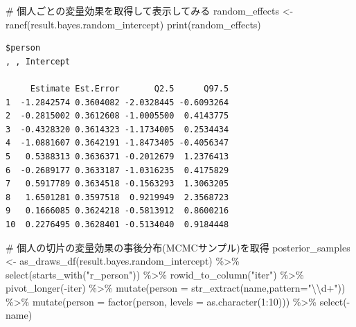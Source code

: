 \documentclass[
  a4paper,
]{ltjsbook}
\newenvironment{Shaded}{\begin{snugshade}}{\end{snugshade}}
\newcommand{\AttributeTok}[1]{\textcolor[rgb]{0.40,0.45,0.13}{#1}}
\newcommand{\CommentTok}[1]{\textcolor[rgb]{0.37,0.37,0.37}{#1}}
\newcommand{\DecValTok}[1]{\textcolor[rgb]{0.68,0.00,0.00}{#1}}
\newcommand{\FunctionTok}[1]{\textcolor[rgb]{0.28,0.35,0.67}{#1}}
\newcommand{\NormalTok}[1]{\textcolor[rgb]{0.00,0.23,0.31}{#1}}
\newcommand{\OtherTok}[1]{\textcolor[rgb]{0.00,0.23,0.31}{#1}}
\newcommand{\SpecialCharTok}[1]{\textcolor[rgb]{0.37,0.37,0.37}{#1}}
\newcommand{\StringTok}[1]{\textcolor[rgb]{0.13,0.47,0.30}{#1}}
\begin{document}
\begin{Shaded}
\begin{Highlighting}[]
\CommentTok{\# 個人ごとの変量効果を取得して表示してみる}
\NormalTok{random\_effects }\OtherTok{\textless{}{-}} \FunctionTok{ranef}\NormalTok{(result.bayes.random\_intercept)}
\FunctionTok{print}\NormalTok{(random\_effects)}
\end{Highlighting}
\end{Shaded}

\begin{verbatim}
$person
, , Intercept

     Estimate Est.Error       Q2.5      Q97.5
1  -1.2842574 0.3604082 -2.0328445 -0.6093264
2  -0.2815002 0.3612608 -1.0005500  0.4143775
3  -0.4328320 0.3614323 -1.1734005  0.2534434
4  -1.0881607 0.3642191 -1.8473405 -0.4056347
5   0.5388313 0.3636371 -0.2012679  1.2376413
6  -0.2689177 0.3633187 -1.0316235  0.4175829
7   0.5917789 0.3634518 -0.1563293  1.3063205
8   1.6501281 0.3597518  0.9219949  2.3568723
9   0.1666085 0.3624218 -0.5813912  0.8600216
10  0.2276495 0.3628401 -0.5134040  0.9184448
\end{verbatim}

\begin{Shaded}
\begin{Highlighting}[]
\CommentTok{\# 個人の切片の変量効果の事後分布(MCMCサンプル)を取得}
\NormalTok{posterior\_samples }\OtherTok{\textless{}{-}} \FunctionTok{as\_draws\_df}\NormalTok{(result.bayes.random\_intercept) }\SpecialCharTok{\%\textgreater{}\%} 
  \FunctionTok{select}\NormalTok{(}\FunctionTok{starts\_with}\NormalTok{(}\StringTok{"r\_person"}\NormalTok{)) }\SpecialCharTok{\%\textgreater{}\%} 
  \FunctionTok{rowid\_to\_column}\NormalTok{(}\StringTok{"iter"}\NormalTok{) }\SpecialCharTok{\%\textgreater{}\%} 
  \FunctionTok{pivot\_longer}\NormalTok{(}\SpecialCharTok{{-}}\NormalTok{iter) }\SpecialCharTok{\%\textgreater{}\%} 
  \FunctionTok{mutate}\NormalTok{(}\AttributeTok{person =} \FunctionTok{str\_extract}\NormalTok{(name,}\AttributeTok{pattern=}\StringTok{"}\SpecialCharTok{\textbackslash{}\textbackslash{}}\StringTok{d+"}\NormalTok{)) }\SpecialCharTok{\%\textgreater{}\%} 
  \FunctionTok{mutate}\NormalTok{(}\AttributeTok{person =} \FunctionTok{factor}\NormalTok{(person, }\AttributeTok{levels =} \FunctionTok{as.character}\NormalTok{(}\DecValTok{1}\SpecialCharTok{:}\DecValTok{10}\NormalTok{))) }\SpecialCharTok{\%\textgreater{}\%} 
  \FunctionTok{select}\NormalTok{(}\SpecialCharTok{{-}}\NormalTok{name)}
\end{Highlighting}
\end{Shaded}
\end{document}
